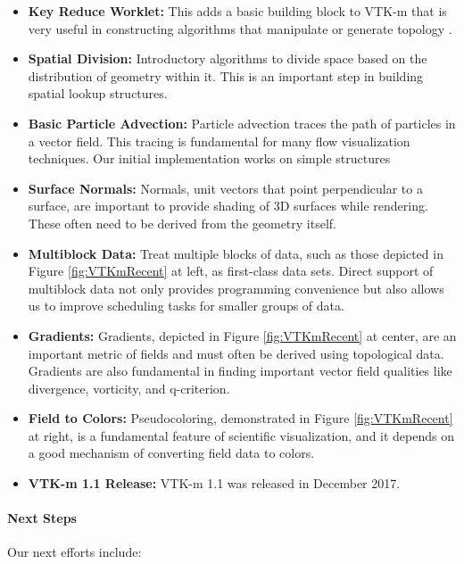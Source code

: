 \begin{itemize}
\item \textbf{Key Reduce Worklet:}
  This adds a basic building block to VTK-m that is very useful in constructing algorithms that manipulate or generate topology \cite{Miller2014}.
\item \textbf{Spatial Division:}
  Introductory algorithms to divide space based on the distribution of geometry within it.
  This is an important step in building spatial lookup structures.
\item \textbf{Basic Particle Advection:}
  Particle advection traces the path of particles in a vector field.
  This tracing is fundamental for many flow visualization techniques.
  Our initial implementation works on simple structures
\item \textbf{Surface Normals:}
  Normals, unit vectors that point perpendicular to a surface, are important to provide shading of 3D surfaces while rendering.
  These often need to be derived from the geometry itself.
\item \textbf{Multiblock Data:}
  Treat multiple blocks of data, such as those depicted in Figure \ref{fig:VTKmRecent} at left, as first-class data sets.
  Direct support of multiblock data not only provides programming convenience but also allows us to improve scheduling tasks for smaller groups of data.
\item \textbf{Gradients:}
  Gradients, depicted in Figure \ref{fig:VTKmRecent} at center, are an important metric of fields and must often be derived using topological data.
  Gradients are also fundamental in finding important vector field qualities like divergence, vorticity, and q-criterion.
\item \textbf{Field to Colors:}
  Pseudocoloring, demonstrated in Figure \ref{fig:VTKmRecent} at right, is a fundamental feature of scientific visualization, and it depends on a good mechanism of converting field data to colors.
\item \textbf{VTK-m 1.1 Release:}
  VTK-m 1.1 was released in December 2017.
\end{itemize}

\paragraph{Next Steps}
Our next efforts include:

